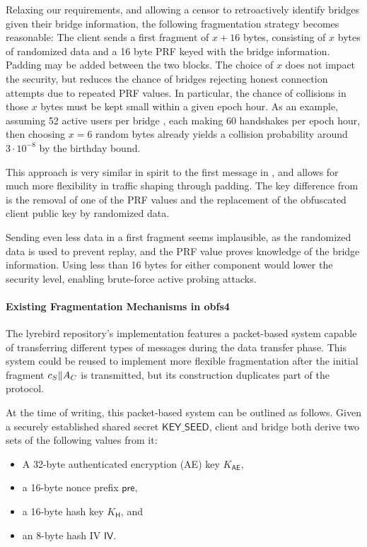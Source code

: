Relaxing our requirements, and allowing a censor to retroactively identify bridges given their bridge information, the following fragmentation strategy becomes reasonable: The client sends a first fragment of $x+16$ bytes, consisting of $x$ bytes of randomized data and a 16 byte PRF keyed with the bridge information. Padding may be added between the two blocks. The choice of $x$ does not impact the security, but reduces the chance of bridges rejecting honest connection attempts due to repeated PRF values. In particular, the chance of collisions in those $x$ bytes must be kept small within a given epoch hour. As an example, assuming 52 active users per bridge \cite{tor-metrics}, each making 60 handshakes per epoch hour, then choosing $x=6$ random bytes already yields a collision probability around $3 \cdot 10^{-8}$ by the birthday bound.

This approach is very similar in spirit to the first message in \obfsfour{}, and allows for much more flexibility in traffic shaping through padding. The key difference from \obfsfour{} is the removal of one of the PRF values and the replacement of the obfuscated client public key by randomized data.

Sending even less data in a first fragment seems implausible, as the randomized data is used to prevent replay, and the PRF value proves knowledge of the bridge information. Using less than 16 bytes for either component would lower the security level, enabling brute-force active probing attacks.

\paragraph{Existing Fragmentation Mechanisms in obfs4}
The lyrebird repository's \obfsfour{} implementation features a packet-based system capable of transferring different types of messages during the data transfer phase. This system could be reused to implement more flexible fragmentation after the initial fragment $c_S \| A_C$ is transmitted, but its construction duplicates part of the \drivel{} protocol.

At the time of writing, this packet-based system can be outlined as follows. Given a securely established shared secret $\mathsf{KEY\_SEED}$, client and bridge both derive two sets of the following values from it:
\begin{itemize}
    \item A 32-byte authenticated encryption (AE) key $K_\mathsf{AE}$,
    \item a 16-byte nonce prefix $\mathsf{pre}$,
    \item a 16-byte hash key $K_\mathsf{H}$, and
    \item an 8-byte hash IV $\mathsf{IV}$.
\end{itemize}

